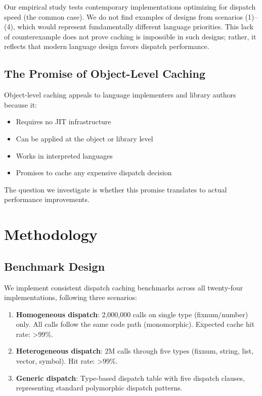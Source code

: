 \documentclass[sigplan,final,acmsmall,review,screen]{acmart}
\begin{document}
Our empirical study tests contemporary implementations optimizing for dispatch speed (the common case). We do not find examples of
designs from scenarios (1)--(4), which would represent fundamentally different language priorities. This lack of counterexample
does not prove caching is impossible in such designs; rather, it reflects that modern language design favors dispatch performance.

\subsection{The Promise of Object-Level Caching}

Object-level caching appeals to language implementers and library authors because it:
\begin{itemize}
  \item Requires no JIT infrastructure
  \item Can be applied at the object or library level
  \item Works in interpreted languages
  \item Promises to cache any expensive dispatch decision
\end{itemize}

The question we investigate is whether this promise translates to actual performance improvements.

\section{Methodology}

\subsection{Benchmark Design}

We implement consistent dispatch caching benchmarks across all twenty-four implementations, following
three scenarios:

\begin{enumerate}
  \item \textbf{Homogeneous dispatch}: 2,000,000 calls on single type (fixnum/number) only.
    All calls follow the same code path (monomorphic). Expected cache hit rate: >99\%.

  \item \textbf{Heterogeneous dispatch}: 2M calls through five types
    (fixnum, string, list, vector, symbol). Hit rate: >99\%.

  \item \textbf{Generic dispatch}: Type-based dispatch table with five dispatch clauses,
    representing standard polymorphic dispatch patterns.
\end{enumerate}
\end{document}
